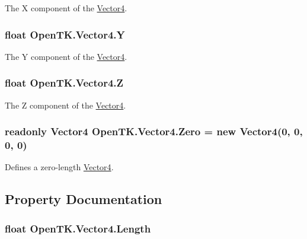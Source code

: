 The X component of the \hyperlink{struct_open_t_k_1_1_vector4}{Vector4}. 

\hypertarget{struct_open_t_k_1_1_vector4_a241130b43eaa8868cb77ceb86fa32dcb}{
\subsubsection[{Y}]{\setlength{\rightskip}{0pt plus 5cm}float Open\-T\-K.\-Vector4.\-Y}}\label{struct_open_t_k_1_1_vector4_a241130b43eaa8868cb77ceb86fa32dcb}


The Y component of the \hyperlink{struct_open_t_k_1_1_vector4}{Vector4}. 

\hypertarget{struct_open_t_k_1_1_vector4_aa1b36c76315defc174611893d1260b46}{
\subsubsection[{Z}]{\setlength{\rightskip}{0pt plus 5cm}float Open\-T\-K.\-Vector4.\-Z}}\label{struct_open_t_k_1_1_vector4_aa1b36c76315defc174611893d1260b46}


The Z component of the \hyperlink{struct_open_t_k_1_1_vector4}{Vector4}. 

\hypertarget{struct_open_t_k_1_1_vector4_a4ee26a366cfffb3bf6ee42ce1c9d53c4}{
\subsubsection[{Zero}]{\setlength{\rightskip}{0pt plus 5cm}readonly {\bf Vector4} Open\-T\-K.\-Vector4.\-Zero = new {\bf Vector4}(0, 0, 0, 0)\hspace{0.3cm}{\ttfamily [static]}}}\label{struct_open_t_k_1_1_vector4_a4ee26a366cfffb3bf6ee42ce1c9d53c4}


Defines a zero-\/length \hyperlink{struct_open_t_k_1_1_vector4}{Vector4}. 



\subsection{Property Documentation}
\hypertarget{struct_open_t_k_1_1_vector4_a5ebc615641557a752cfe160608f09832}{
\subsubsection[{Length}]{\setlength{\rightskip}{0pt plus 5cm}float Open\-T\-K.\-Vector4.\-Length\hspace{0.3cm}{\ttfamily [get]}}}\label{struct_open_t_k_1_1_vector4_a5ebc615641557a752cfe160608f09832}


